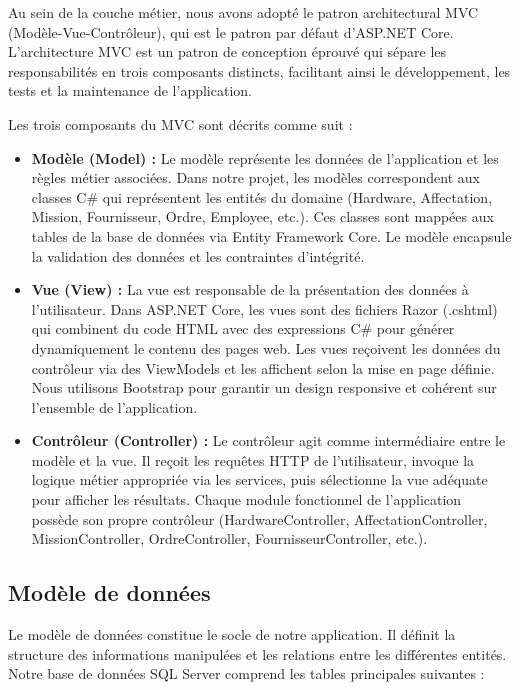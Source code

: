 Au sein de la couche métier, nous avons adopté le patron architectural MVC (Modèle-Vue-Contrôleur), qui est le patron par défaut d'ASP.NET Core. L'architecture MVC est un patron de conception éprouvé qui sépare les responsabilités en trois composants distincts, facilitant ainsi le développement, les tests et la maintenance de l'application.

Les trois composants du MVC sont décrits comme suit :

\begin{itemize}
    \item [$-$] \textbf{Modèle (Model) :} Le modèle représente les données de l'application et les règles métier associées. Dans notre projet, les modèles correspondent aux classes C\# qui représentent les entités du domaine (Hardware, Affectation, Mission, Fournisseur, Ordre, Employee, etc.). Ces classes sont mappées aux tables de la base de données via Entity Framework Core. Le modèle encapsule la validation des données et les contraintes d'intégrité.
    
    \item [$-$] \textbf{Vue (View) :} La vue est responsable de la présentation des données à l'utilisateur. Dans ASP.NET Core, les vues sont des fichiers Razor (.cshtml) qui combinent du code HTML avec des expressions C\# pour générer dynamiquement le contenu des pages web. Les vues reçoivent les données du contrôleur via des ViewModels et les affichent selon la mise en page définie. Nous utilisons Bootstrap pour garantir un design responsive et cohérent sur l'ensemble de l'application.
    
    \item [$-$] \textbf{Contrôleur (Controller) :} Le contrôleur agit comme intermédiaire entre le modèle et la vue. Il reçoit les requêtes HTTP de l'utilisateur, invoque la logique métier appropriée via les services, puis sélectionne la vue adéquate pour afficher les résultats. Chaque module fonctionnel de l'application possède son propre contrôleur (HardwareController, AffectationController, MissionController, OrdreController, FournisseurController, etc.).
\end{itemize}

\subsection{Modèle de données}

Le modèle de données constitue le socle de notre application. Il définit la structure des informations manipulées et les relations entre les différentes entités. Notre base de données SQL Server comprend les tables principales suivantes :

